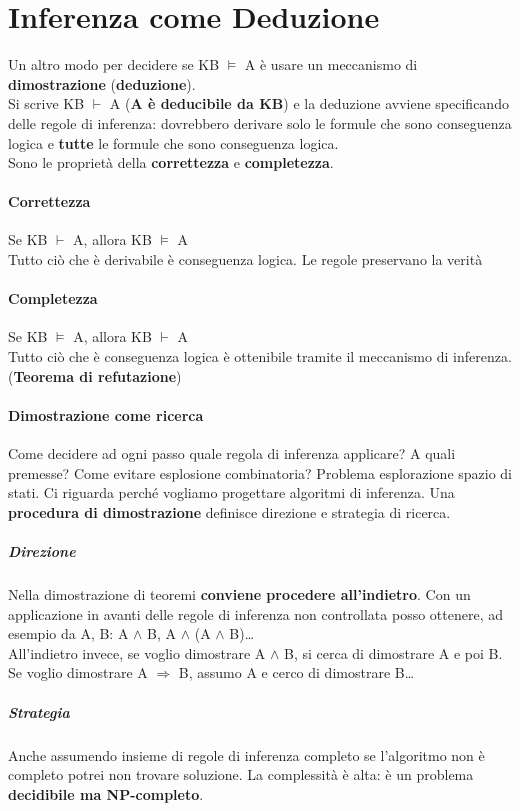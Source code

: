 \documentclass[10pt]{book}
\begin{document}
\section{Inferenza come Deduzione}
Un altro modo per decidere se KB $\vDash$ A è usare un meccanismo di \textbf{dimostrazione} (\textbf{deduzione}).\\
Si scrive KB $\vdash$ A (\textbf{A è deducibile da KB}) e la deduzione avviene specificando delle regole di inferenza: dovrebbero derivare solo le formule che sono conseguenza logica e \textbf{tutte} le formule che sono conseguenza logica.\\
Sono le proprietà della \textbf{correttezza} e \textbf{completezza}.
\paragraph{Correttezza} Se KB $\vdash$ A, allora KB $\vDash$ A\\
Tutto ciò che è derivabile è conseguenza logica. Le regole preservano la verità
\paragraph{Completezza} Se KB $\vDash$ A, allora KB $\vdash$ A\\
Tutto ciò che è conseguenza logica è ottenibile tramite il meccanismo di inferenza.\\
(\textbf{Teorema di refutazione})
\paragraph{Dimostrazione come ricerca}
Come decidere ad ogni passo quale regola di inferenza applicare? A quali premesse? Come evitare esplosione combinatoria? Problema esplorazione spazio di stati. Ci riguarda perché vogliamo progettare algoritmi di inferenza. Una \textbf{procedura di dimostrazione} definisce direzione e strategia di ricerca.
\subparagraph{Direzione} Nella dimostrazione di teoremi \textbf{conviene procedere all'indietro}. Con un applicazione in avanti delle regole di inferenza non controllata posso ottenere, ad esempio da A, B: A $\wedge$ B, A $\wedge$ (A $\wedge$ B)\ldots\\
All'indietro invece, se voglio dimostrare A $\wedge$ B, si cerca di dimostrare A e poi B. Se voglio dimostrare A $\Rightarrow$ B, assumo A e cerco di dimostrare B\ldots
\subparagraph{Strategia} Anche assumendo insieme di regole di inferenza completo se l'algoritmo non è completo potrei non trovare soluzione. La complessità è alta: è un problema \textbf{decidibile ma NP-completo}.
\end{document}
